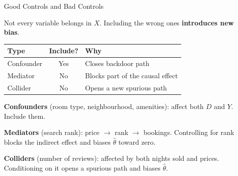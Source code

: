 \documentclass[aspectratio=169, 11pt]{beamer}
\begin{document}
\begin{frame}{Good Controls and Bad Controls}

Not every variable belongs in $X$. Including the wrong ones \textbf{introduces new bias}.

\bigskip

\begin{center}
\begin{tabular}{lcl}
\toprule
\textbf{Type} & \textbf{Include?} & \textbf{Why} \\
\midrule
Confounder  & \textcolor{noteblue}{Yes} & Closes backdoor path \\
Mediator    & \textcolor{warnred}{No}  & Blocks part of the causal effect \\
Collider    & \textcolor{warnred}{No}  & Opens a new spurious path \\
\bottomrule
\end{tabular}
\end{center}

\bigskip
\pause

\textbf{Confounders} (room type, neighbourhood, amenities): affect both $D$ and $Y$. Include them.

\bigskip

\textbf{Mediators} (search rank): price $\to$ rank $\to$ bookings. Controlling for rank blocks the indirect effect and biases $\hat{\theta}$ toward zero.

\bigskip

\textbf{Colliders} (number of reviews): affected by both nights sold and prices. Conditioning on it opens a spurious path and biases $\hat{\theta}$.

\end{frame}
\end{document}
